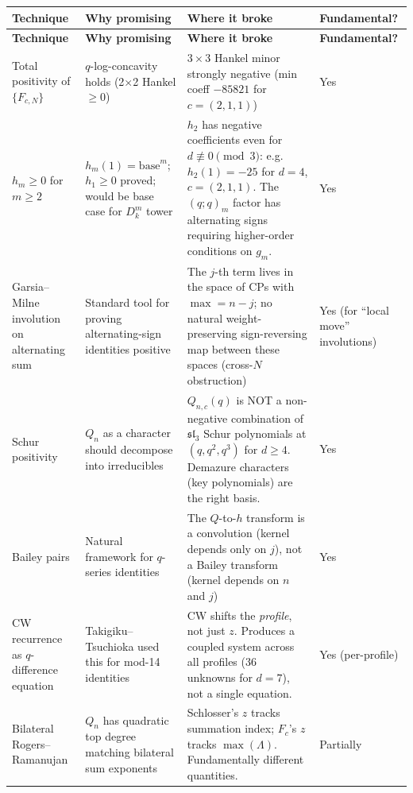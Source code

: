 \documentclass[11pt]{article}
\theoremstyle{definition}
\begin{document}
\begin{longtable}{@{}p{3.5cm}p{4cm}p{4cm}p{2.5cm}@{}}
\toprule
\textbf{Technique} & \textbf{Why promising} & \textbf{Where it broke} & \textbf{Fundamental?} \\
\midrule
\endfirsthead
\toprule
\textbf{Technique} & \textbf{Why promising} & \textbf{Where it broke} & \textbf{Fundamental?} \\
\midrule
\endhead
\bottomrule
\endlastfoot

Total positivity of $\{F_{c,N}\}$ &
$q$-log-concavity holds (2$\times$2 Hankel $\geq 0$) &
$3 \times 3$ Hankel minor strongly negative (min coeff $-85821$ for $c=(2,1,1)$) &
Yes \\

$h_m \geq 0$ for $m \geq 2$ &
$h_m(1) = \text{base}^m$; $h_1 \geq 0$ proved; would be base case for $D_k^m$ tower &
$h_2$ has negative coefficients even for $d \not\equiv 0\!\pmod{3}$: e.g.\ $h_2(1) = -25$ for $d=4$, $c=(2,1,1)$. The $(q;q)_m$ factor has alternating signs requiring higher-order conditions on $g_m$. &
Yes \\

Garsia--Milne involution on alternating sum &
Standard tool for proving alternating-sign identities positive &
The $j$-th term lives in the space of CPs with $\max = n-j$; no natural weight-preserving sign-reversing map between these spaces (cross-$N$ obstruction) &
Yes (for ``local move'' involutions) \\

Schur positivity &
$Q_n$ as a character should decompose into irreducibles &
$Q_{n,c}(q)$ is NOT a non-negative combination of $\mathfrak{sl}_3$ Schur polynomials at $(q,q^2,q^3)$ for $d \geq 4$. Demazure characters (key polynomials) are the right basis. &
Yes \\

Bailey pairs &
Natural framework for $q$-series identities &
The $Q$-to-$h$ transform is a convolution (kernel depends only on $j$), not a Bailey transform (kernel depends on $n$ and $j$) &
Yes \\

CW recurrence as $q$-difference equation &
Takigiku--Tsuchioka used this for mod-14 identities &
CW shifts the \emph{profile}, not just $z$. Produces a coupled system across all profiles (36 unknowns for $d=7$), not a single equation. &
Yes (per-profile) \\

Bilateral Rogers--Ramanujan &
$Q_n$ has quadratic top degree matching bilateral sum exponents &
Schlosser's $z$ tracks summation index; $F_c$'s $z$ tracks $\max(\Lambda)$. Fundamentally different quantities. &
Partially \\


\end{longtable}
\end{document}
